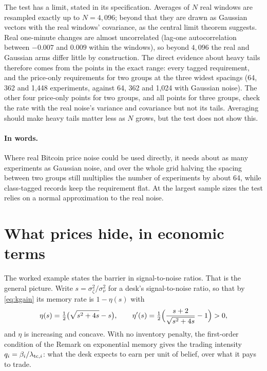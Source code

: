 \documentclass[12pt]{article}
\theoremstyle{definition}
\theoremstyle{remark}
\begin{document}
The test has a limit, stated in its specification. Averages of $N$ real windows are resampled exactly up to $N=4{,}096$; beyond that they are drawn as Gaussian vectors with the real windows' covariance, as the central limit theorem suggests. Real one-minute changes are almost uncorrelated (lag-one autocorrelation between $-0.007$ and $0.009$ within the windows), so beyond $4{,}096$ the real and Gaussian arms differ little by construction. The direct evidence about heavy tails therefore comes from the points in the exact range: every tagged requirement, and the price-only requirements for two groups at the three widest spacings (64, 362 and 1{,}448 experiments, against 64, 362 and 1{,}024 with Gaussian noise). The other four price-only points for two groups, and all points for three groups, check the rate with the real noise's variance and covariance but not its tails. Averaging should make heavy tails matter less as $N$ grows, but the test does not show this.

\paragraph{In words.} Where real Bitcoin price noise could be used directly, it needs about as many experiments as Gaussian noise, and over the whole grid halving the spacing between two groups still multiplies the number of experiments by about 64, while class-tagged records keep the requirement flat. At the largest sample sizes the test relies on a normal approximation to the real noise.

\section{What prices hide, in economic terms}\label{sec:primitives}

The worked example states the barrier in signal-to-noise ratios. That is the general picture. Write $s=\sigma_\zeta^2/\sigma_\nu^2$ for a desk's signal-to-noise ratio, so that by \eqref{eq:kgain} its memory rate is $1-\eta(s)$ with
\[
\eta(s)=\tfrac12\bigl(\sqrt{s^2+4s}-s\bigr),\qquad \eta'(s)=\tfrac12\Bigl(\frac{s+2}{\sqrt{s^2+4s}}-1\Bigr)>0 ,
\]
and $\eta$ is increasing and concave. With no inventory penalty, the first-order condition of the Remark on exponential memory gives the trading intensity $q_i=\beta_i/\lambda_{{\rm tc},i}$: what the desk expects to earn per unit of belief, over what it pays to trade.
\end{document}
